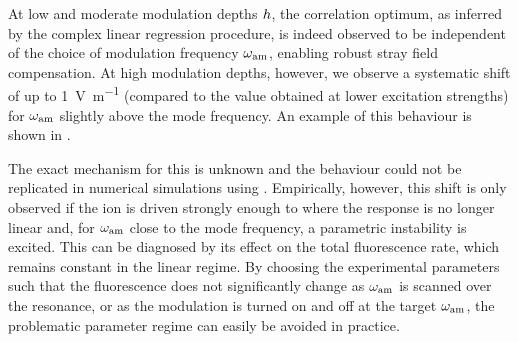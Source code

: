 \documentclass[pra,twocolumn]{revtex4-2}
\begin{document}
At low and moderate modulation depths $h$, the correlation optimum, as inferred by the complex linear regression procedure, is indeed observed to be independent of the choice of modulation frequency $\omega_{\textrm{am}}$, enabling robust stray field compensation. At high modulation depths, however, we observe a systematic shift of up to \SI{1}{\volt \metre^{-1}} (compared to the value obtained at lower excitation strengths) for $\omega_{\textrm{am}}$ slightly above the mode frequency.
An example of this behaviour is shown in .

The exact mechanism for this is unknown and the behaviour could not be replicated in numerical simulations using .
Empirically, however, this shift is only observed if the ion is driven strongly enough to where the response is no longer linear and, for $\omega_{\textrm{am}}$ close to the mode frequency, a parametric instability is excited.
This can be diagnosed by its effect on the total fluorescence rate, which remains constant in the linear regime.
By choosing the experimental parameters such that the fluorescence does not significantly change as $\omega_{\textrm{am}}$ is scanned over the resonance, or as the modulation is turned on and off at the target $\omega_{\textrm{am}}$, the problematic parameter regime can easily be avoided in practice.



\end{document}
